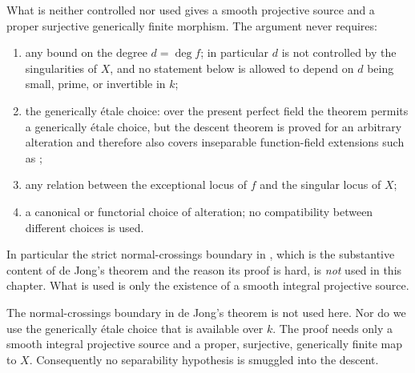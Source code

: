 \begin{warning}{What is neither controlled nor used}
\label{warn:ch42-de-jong-scope}
 gives a smooth projective source and a proper
surjective generically finite morphism.  The argument never requires:
\begin{enumerate}
\item any bound on the degree $d=\deg f$; in particular $d$ is not
      controlled by the singularities of $X$, and no statement below is
      allowed to depend on $d$ being small, prime, or invertible in $k$;
\item the generically étale choice: over the present perfect field the
      theorem permits a generically étale choice, but the descent theorem
      is proved for an arbitrary alteration and therefore also covers
      inseparable function-field extensions such as
      ;
\item any relation between the exceptional locus of $f$ and the singular
      locus of $X$;
\item a canonical or functorial choice of alteration; no compatibility
      between different choices is used.
\end{enumerate}
In particular the strict normal-crossings boundary in
, which is the substantive content of de Jong's
theorem and the reason its proof is hard, is \emph{not} used in this
chapter.  What is used is only the existence of a smooth integral projective
source.
\end{warning}

\begin{remark}
\label{rem:ch42-what-is-used}
The normal-crossings boundary in de Jong's theorem is not used here.
Nor do we use the generically étale choice that is available over $k$.
The proof needs only a smooth integral projective source and a proper,
surjective, generically finite map to $X$.
Consequently no separability hypothesis is smuggled into the descent.
\end{remark}

